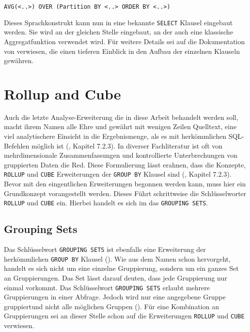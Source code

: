 \texttt{AVG(<..>) OVER (Partition BY <..> ORDER BY <..>)} \\ \citep[Analytic
Functions]{Nuijten2023}

Dieses Sprachkonstrukt kann nun in eine bekannte \texttt{SELECT} Klausel
eingebaut werden. Sie wird an der gleichen Stelle eingebaut, an der auch eine
klassische Aggregatfunktion verwendet wird. Für weitere Details sei auf die Dokumentation
von \citet{oracle} verwiesen, die einen tieferen Einblick in den Aufbau der einzelnen
Klauseln gewähren.


\section{Rollup and Cube}
\label{sec:rollup_and_cube} Auch die letzte Analyse-Erweiterung die in diese
Arbeit behandelt werden soll, macht ihrem Namen alle Ehre und gewährt mit wenigen
Zeilen Quelltext, eine viel analytischere Einsicht in die Ergebnismenge, als es mit
herkömmlichen SQL-Befehlen möglich ist (\cite{melton2002advanced}, Kapitel 7.2.3).
In diverser Fachliteratur ist oft von mehrdimensionale Zusammenfassungen und
kontrollierte Unterbrechungen von gruppierten Daten die Red. Diese Formulierung lässt
erahnen, dass die Konzepte, \texttt{ROLLUP} und \texttt{CUBE} Erweiterungen der \texttt{GROUP
BY} Klausel sind (\cite{melton2002advanced}, Kapitel 7.2.3). Bevor mit den eingentlichen
Erweiterungen begonnen werden kann, muss hier ein Grundkonzept vorangestellt
werden. Dieses Führt schrittweise die Schlüsselworter \texttt{ROLLUP} und
\texttt{CUBE} ein. Hierbei handelt es sich im das \texttt{GROUPING SETS}.

\subsection{Grouping Sets}
Das Schlüsselwort \texttt{GROUPING SETS} ist ebenfalls eine Erweiterung der
herkömmlichen \texttt{GROUP BY} Klausel (\cite{oracle16}). Wie aus dem Namen
schon hervorgeht, handelt es sich nicht um eine einzelne Gruppierung, sondern um
ein ganzes Set an Gruppierungen. Das Set lässt darauf deuten, dass jede
Gruppierung nur einmal vorkommt. Das Schlüsselwort \texttt{GROUPING SETS}
erlaubt mehrere Gruppierungen in einer Abfrage. Jedoch wird nur eine angegebene Gruppe
gruppiertund nicht alle möglichen Gruppen (\cite{oracle16}). Für eine
Kombination an Gruppierungen sei an dieser Stelle schon auf die Erweiterungen
\texttt{ROLLUP} und \texttt{CUBE} verwiesen.


